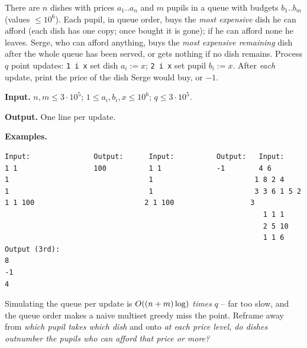 \begin{problemstatement}
There are \(n\) dishes with prices \(a_1..a_n\) and \(m\) pupils in a queue with
budgets \(b_1..b_m\) (values \(\le 10^6\)).  Each pupil, in queue order, buys the
\emph{most expensive} dish he can afford (each dish has one copy; once bought it
is gone); if he can afford none he leaves.  Serge, who can afford anything, buys
the \emph{most expensive remaining} dish after the whole queue has been served,
or gets nothing if no dish remains.  Process \(q\) point updates:
\texttt{1 i x} set dish \(a_i:=x\); \texttt{2 i x} set pupil \(b_i:=x\).  After
\emph{each} update, print the price of the dish Serge would buy, or \(-1\).

\textbf{Input.} \(n,m\le 3\cdot10^5\); \(1\le a_i,b_i,x\le 10^6\); \(q\le 3\cdot10^5\).

\textbf{Output.} One line per update.

\textbf{Examples.}
\begin{verbatim}
Input:               Output:      Input:          Output:   Input:
1 1                  100          1 1             -1        4 6
1                                 1                        1 8 2 4
1                                 1                        3 3 6 1 5 2
1 1 100                          2 1 100                  3
                                                             1 1 1
                                                             2 5 10
                                                             1 1 6
Output (3rd):
8
-1
4
\end{verbatim}
\end{problemstatement}

\begin{attemptgate}
Simulating the queue per update is \(O((n+m)\log)\) \emph{times} \(q\) -- far
too slow, and the queue order makes a naive multiset greedy miss the point.
Reframe away from \emph{which pupil takes which dish} and onto \emph{at each
price level, do dishes outnumber the pupils who can afford that price or more?}
\end{attemptgate}


